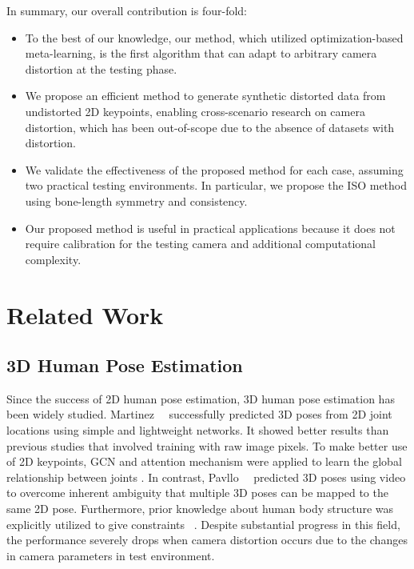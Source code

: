     In summary, our overall contribution is four-fold:
    \vspace{-1mm}
    \begin{itemize}
        \item To the best of our knowledge, our method, which utilized optimization-based meta-learning, is the first algorithm that can adapt to arbitrary camera distortion at the testing phase.
        \vspace{-2mm}
        \item We propose an efficient method to generate synthetic distorted data from undistorted 2D keypoints, enabling cross-scenario research on camera distortion, which has been out-of-scope due to the absence of datasets with distortion.
        \vspace{-2mm}
        \item We validate the effectiveness of the proposed method for each case, assuming two practical testing environments. In particular, we propose the ISO method using bone-length symmetry and consistency.
        \vspace{-2mm}
        \item Our proposed method is useful in practical applications because it does not require calibration for the testing camera and additional computational complexity.
    \end{itemize}


\section{Related Work}
    \subsection{3D Human Pose Estimation}
        \vspace{-1mm}
        Since the success of 2D human pose estimation, 3D human pose estimation has been widely studied. Martinez~\etal~\cite{ref7_martinez2017simple} successfully predicted 3D poses from 2D joint locations using simple and lightweight networks. It showed better results than previous studies that involved training with raw image pixels. To make better use of 2D keypoints, GCN and attention mechanism were applied to learn the global relationship between joints \cite{ref8_zhao2019semantic,ref12_liu2020attention}. In contrast, Pavllo~\etal~\cite{ref9_pavllo20193d} predicted 3D poses using video to overcome inherent ambiguity that multiple 3D poses can be mapped to the same 2D pose. Furthermore, prior knowledge about human body structure was explicitly utilized to give constraints ~\cite{ref10_cai2019exploiting,ref11_anatomy3D}. Despite substantial progress in this field, the performance severely drops when camera distortion occurs due to the changes in camera parameters in test environment.
    
